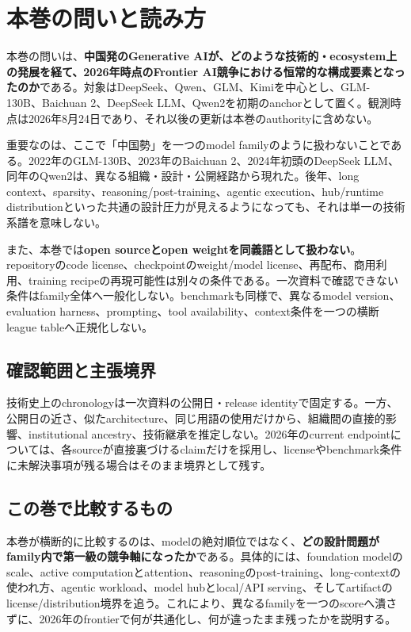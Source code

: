 \documentclass[lualatex,a4paper,10pt]{jlreq}
\begin{document}
\surveycover
\clearpage

\section*{本巻の問いと読み方}
本巻の問いは、\textbf{中国発のGenerative AIが、どのような技術的・ecosystem上の発展を経て、2026年時点のFrontier AI競争における恒常的な構成要素となったのか}である。対象はDeepSeek、Qwen、GLM、Kimiを中心とし、GLM-130B、Baichuan 2、DeepSeek LLM、Qwen2を初期のanchorとして置く。観測時点は2026年8月24日であり、それ以後の更新は本巻のauthorityに含めない。

重要なのは、ここで「中国勢」を一つのmodel familyのように扱わないことである。2022年のGLM-130B、2023年のBaichuan 2、2024年初頭のDeepSeek LLM、同年のQwen2は、異なる組織・設計・公開経路から現れた。後年、long context、sparsity、reasoning/post-training、agentic execution、hub/runtime distributionといった共通の設計圧力が見えるようになっても、それは単一の技術系譜を意味しない。\autocite{glm130b,baichuan2,deepseekllm,qwen2}

また、本巻では\textbf{open sourceとopen weightを同義語として扱わない}。repositoryのcode license、checkpointのweight/model license、再配布、商用利用、training recipeの再現可能性は別々の条件である。一次資料で確認できない条件はfamily全体へ一般化しない。benchmarkも同様で、異なるmodel version、evaluation harness、prompting、tool availability、context条件を一つの横断league tableへ正規化しない。

\subsection*{確認範囲と主張境界}
技術史上のchronologyは一次資料の公開日・release identityで固定する。一方、公開日の近さ、似たarchitecture、同じ用語の使用だけから、組織間の直接的影響、institutional ancestry、技術継承を推定しない。2026年のcurrent endpointについては、各sourceが直接裏づけるclaimだけを採用し、licenseやbenchmark条件に未解決事項が残る場合はそのまま境界として残す。

\subsection*{この巻で比較するもの}
本巻が横断的に比較するのは、modelの絶対順位ではなく、\textbf{どの設計問題がfamily内で第一級の競争軸になったか}である。具体的には、foundation modelのscale、active computationとattention、reasoningのpost-training、long-contextの使われ方、agentic workload、model hubとlocal/API serving、そしてartifactのlicense/distribution境界を追う。これにより、異なるfamilyを一つのscoreへ潰さずに、2026年のfrontierで何が共通化し、何が違ったまま残ったかを説明する。
\end{document}

